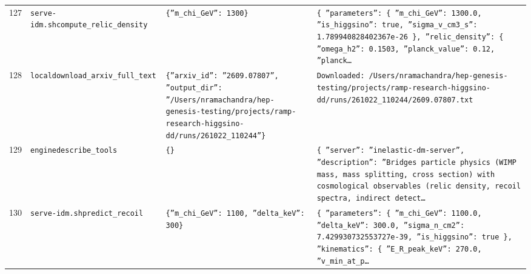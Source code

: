 \documentclass[11pt,a4paper]{article}
\begin{document}
\begin{longtable}{@{}p{}p{}p{}p{}@{}}
127 & \texttt{serve-idm.sh}\newline\texttt{compute\_\allowbreak{}relic\_\allowbreak{}density} & \texttt{\{''m\_\allowbreak{}chi\_\allowbreak{}GeV'':\allowbreak{} 1300\}\allowbreak{}} & \texttt{\{   ''parameters'':\allowbreak{} \{     ''m\_\allowbreak{}chi\_\allowbreak{}GeV'':\allowbreak{} 1300.0,\allowbreak{}     ''is\_\allowbreak{}higgsino'':\allowbreak{} true,\allowbreak{}     ''sigma\_\allowbreak{}v\_\allowbreak{}cm3\_\allowbreak{}s'':\allowbreak{} 1.789940828402367e-26   \}\allowbreak{},\allowbreak{}   ''relic\_\allowbreak{}density'':\allowbreak{} \{     ''omega\_\allowbreak{}h2'':\allowbreak{} 0.1503,\allowbreak{}     ''planck\_\allowbreak{}value'':\allowbreak{} 0.12,\allowbreak{}     ''planck\ldots{}\allowbreak{}} \\
128 & \texttt{local}\newline\texttt{download\_\allowbreak{}arxiv\_\allowbreak{}full\_\allowbreak{}text} & \texttt{\{''arxiv\_\allowbreak{}id'':\allowbreak{} ''2609.07807'',\allowbreak{} ''output\_\allowbreak{}dir'':\allowbreak{} ''/\allowbreak{}Users/\allowbreak{}nramachandra/\allowbreak{}hep-genesis-testing/\allowbreak{}projects/\allowbreak{}ramp-research-higgsino-dd/\allowbreak{}runs/\allowbreak{}261022\_\allowbreak{}110244''\}\allowbreak{}} & \texttt{Downloaded:\allowbreak{} /\allowbreak{}Users/\allowbreak{}nramachandra/\allowbreak{}hep-genesis-testing/\allowbreak{}projects/\allowbreak{}ramp-research-higgsino-dd/\allowbreak{}runs/\allowbreak{}261022\_\allowbreak{}110244/\allowbreak{}2609.07807.txt} \\
129 & \texttt{engine}\newline\texttt{describe\_\allowbreak{}tools} & \texttt{\{\}\allowbreak{}} & \texttt{\{   ''server'':\allowbreak{} ''inelastic-dm-server'',\allowbreak{}   ''description'':\allowbreak{} ''Bridges particle physics (WIMP mass,\allowbreak{} mass splitting,\allowbreak{} cross section)\allowbreak{} with cosmological observables (relic density,\allowbreak{} recoil spectra,\allowbreak{} indirect detect\ldots{}\allowbreak{}} \\
130 & \texttt{serve-idm.sh}\newline\texttt{predict\_\allowbreak{}recoil} & \texttt{\{''m\_\allowbreak{}chi\_\allowbreak{}GeV'':\allowbreak{} 1100,\allowbreak{} ''delta\_\allowbreak{}keV'':\allowbreak{} 300\}\allowbreak{}} & \texttt{\{   ''parameters'':\allowbreak{} \{     ''m\_\allowbreak{}chi\_\allowbreak{}GeV'':\allowbreak{} 1100.0,\allowbreak{}     ''delta\_\allowbreak{}keV'':\allowbreak{} 300.0,\allowbreak{}     ''sigma\_\allowbreak{}n\_\allowbreak{}cm2'':\allowbreak{} 7.429930732553727e-39,\allowbreak{}     ''is\_\allowbreak{}higgsino'':\allowbreak{} true   \}\allowbreak{},\allowbreak{}   ''kinematics'':\allowbreak{} \{     ''E\_\allowbreak{}R\_\allowbreak{}peak\_\allowbreak{}keV'':\allowbreak{} 270.0,\allowbreak{}     ''v\_\allowbreak{}min\_\allowbreak{}at\_\allowbreak{}p\ldots{}\allowbreak{}} \\

\end{longtable}
\end{document}
